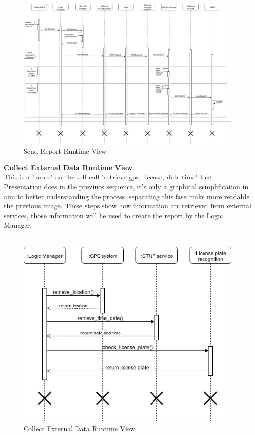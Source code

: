 \documentclass{article}
\begin{document}
\begin{figure}[H]
    \centering
    \includegraphics[scale=0.3]{img/sequence_diagrams/send_report_sequence.png}
    \caption{Send Report Runtime View}
\end{figure}  
\clearpage
\textbf{Collect External Data Runtime View}\\  
This is a "zoom" on the self call "retrieve gps, license, date time" that Presentation does in the 
previuos sequence, it's only a graphical semplification in aim to better understanding the process, 
separating this fase make more readable the previous image. These steps show how information are 
retrieved from external services, those information will be used to create the report by the Logic Manager.
\\
\\
\begin{figure}[H]
    \centering
    \includegraphics[scale=0.6]{img/sequence_diagrams/collect_external_data_sequence.png}
    \caption{Collect External Data Runtime View}
\end{figure}
\end{document}
